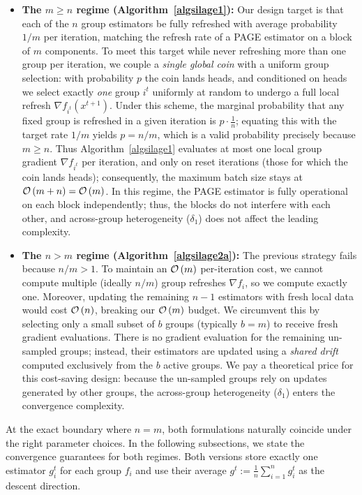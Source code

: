 \documentclass{article}
\newcommand{\cO}{{\cal O}}
\newcommand{\eqdef}{:=}
\newcommand{\rb}[1]{\left(#1\right)}
\theoremstyle{plain}
\newcommand{\algname}[1]{{\sf\scalefont{0.88}\color{mydarkgreen}#1}\xspace}
\def\algname#1{#1}%
\begin{document}
\begin{itemize}[leftmargin=*]
    \item \textbf{The $m \ge n$ regime (Algorithm~\ref{algsilage1}):} Our design target is that each of the $n$ group estimators be fully refreshed with average probability $1/m$ per iteration, matching the refresh rate of a \algname{PAGE} estimator on a block of $m$ components. To meet this target while never refreshing more than one group per iteration, we couple a \emph{single global coin} with a uniform group selection: with probability $p$ the coin lands heads, and conditioned on heads we select exactly \emph{one} group $i^t$ uniformly at random to undergo a full local refresh $\nabla f_{i^t}(x^{t+1})$. Under this scheme, the marginal probability that any fixed group is refreshed in a given iteration is $p\cdot\frac{1}{n}$; equating this with the target rate $1/m$ yields $p = n/m$, which is a valid probability precisely because $m \ge n$. Thus Algorithm~\ref{algsilage1} evaluates at most one local group gradient $\nabla f_{i^t}$ per iteration, and only on reset iterations (those for which the coin lands heads); consequently, the maximum batch size stays at $\cO\rb{m+n}=\cO\rb{m}$. In this regime, the \algname{PAGE} estimator is fully operational on each block independently; thus, the blocks do not interfere with each other, and across-group heterogeneity ($\delta_1$) does not affect the leading complexity.
        \item \textbf{The $n > m$ regime (Algorithm~\ref{algsilage2a}):} The previous strategy fails because $n/m > 1$.
        To maintain an $\cO\rb{m}$ per-iteration cost, we cannot compute multiple (ideally $n/m$) group refreshes $\nabla f_{i}$, so we compute exactly one.
        Moreover, updating the remaining $n-1$ estimators with fresh local data would cost $\cO\rb{n}$, breaking our $\cO\rb{m}$ budget. We circumvent this by selecting only a small subset of $b$ groups (typically $b=m$) to receive fresh gradient evaluations. There is no gradient evaluation for the remaining un-sampled groups; instead, their estimators are updated using a \emph{shared drift} computed exclusively from the $b$ active groups. We pay a theoretical price for this cost-saving design: because the un-sampled groups rely on updates generated by other groups, the across-group heterogeneity ($\delta_1$) enters the convergence complexity.
        \end{itemize}
At the exact boundary where $n=m$, both formulations naturally coincide under the right parameter choices. In the following subsections, we state the convergence guarantees for both regimes. Both versions store exactly one estimator $g_i^t$ for each group $f_i$ and use their average $g^t \eqdef \frac1n\sum_{i=1}^n g_i^t$ as the descent direction.
\end{document}
